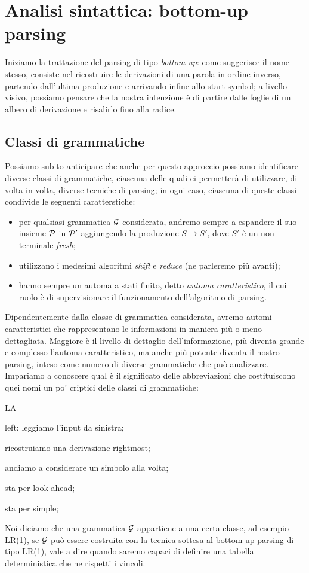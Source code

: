 \documentclass[class=book, crop=false, oneside, 12pt]{standalone}
\begin{document}
\chapter{Analisi sintattica: bottom-up parsing}
Iniziamo la trattazione del parsing di tipo \emph{bottom-up}: come suggerisce il nome stesso, consiste nel ricostruire le derivazioni di una parola in ordine inverso, partendo dall'ultima produzione e arrivando infine allo start symbol; a livello visivo, possiamo pensare che la nostra intenzione è di partire dalle foglie di un albero di derivazione e risalirlo fino alla radice.

\section{Classi di grammatiche}
Possiamo subito anticipare che anche per questo approccio possiamo identificare diverse classi di grammatiche, ciascuna delle quali ci permetterà di utilizzare, di volta in volta, diverse tecniche di parsing; in ogni caso, ciascuna di queste classi condivide le seguenti caratterstiche:
\begin{itemize}
    \item per qualsiasi grammatica \(\G\) considerata, andremo sempre a espandere il suo insieme \(\P\) in \(\P'\) aggiungendo la produzione \(S \to S'\), dove \(S'\) è un non-terminale \emph{fresh};
    \item utilizzano i medesimi algoritmi \emph{shift} e \emph{reduce} (ne parleremo più avanti);
    \item hanno sempre un automa a stati finito, detto \emph{automa caratteristico}, il cui ruolo è di supervisionare il funzionamento dell'algoritmo di parsing.
\end{itemize}
Dipendentemente dalla classe di grammatica considerata, avremo automi caratteristici che rappresentano le informazioni in maniera più o meno dettagliata. Maggiore è il livello di dettaglio dell'informazione, più diventa grande e complesso l'automa caratteristico, ma anche più potente diventa il nostro parsing, inteso come numero di diverse grammatiche che può analizzare. Impariamo a conoscere qual è il significato delle abbreviazioni che costituiscono quei nomi un po' criptici delle classi di grammatiche:
\begin{labeling}{LA}
    \item[L] left: leggiamo l'input da sinistra;
    \item[R] ricostruiamo una derivazione rightmost;
    \item[1] andiamo a considerare un simbolo alla volta;
    \item[LA] sta per look ahead;
    \item[S] sta per simple;  
\end{labeling}
Noi diciamo che una grammatica \(\G\) appartiene a una certa classe, ad esempio LR(1), se \(\G\) può essere costruita con la tecnica sottesa al bottom-up parsing di tipo LR(1), vale a dire quando saremo capaci di definire una tabella deterministica che ne rispetti i vincoli.
\end{document}
